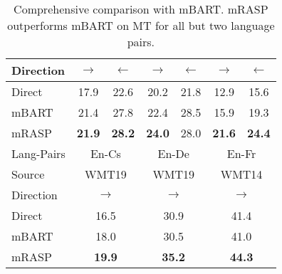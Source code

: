 \documentclass[11pt,a4paper]{article}
\newcommand{\mf}[1]{\multicolumn{2}{c}{ #1}}
\newcommand{\method}{mRASP\xspace}
\newcommand{\baseline}{Direct}
\begin{document}
\begin{table}[ht]
\begin{center}
{\begin{tabular}{lcccccc}
 Direction & 
 $\rightarrow$ &$\leftarrow$ &

 $\rightarrow$ &$\leftarrow$ &


 $\rightarrow$ &$\leftarrow$ \\




\midrule

 \baseline &
17.9 & 22.6 & 20.2 & 21.8 &  12.9 & 15.6 

\\


mBART &
 21.4 & 27.8  &
  22.4 &  28.5 &
15.9 &  19.3
 


\\


 \method &
\textbf{21.9} & \textbf{28.2} &
 \textbf{24.0} &  28.0 &
 \textbf{21.6} & \textbf{24.4}

\\


\midrule
\midrule

Lang-Pairs & 

\mf{En-Cs} & 
\mf{En-De} &
\mf{En-Fr}


\\

Source & 
\mf{WMT19}   & 
\mf{WMT19}   & 
\mf{WMT14}  

\\


 Direction & 
 \mf{$\rightarrow$} & 

 \mf{$\rightarrow$} &


 \mf{$\rightarrow$} 
 
\\


\midrule

 \baseline &
\mf{16.5} & \mf{30.9} &  \mf{41.4}   

\\


mBART &
\mf{18.0}  &
\mf{30.5} & 
\mf{41.0}
 

\\


\method &
\mf{\textbf{19.9}} & 
\mf{\textbf{35.2}} &  
\mf{\textbf{44.3}}

\\


\bottomrule
\end{tabular}
}
\caption{Comprehensive comparison with mBART. \method  outperforms mBART on MT for all but two language pairs.}
\label{tab:cmp-mBART}
\end{center}
\end{table} 
\end{document}
